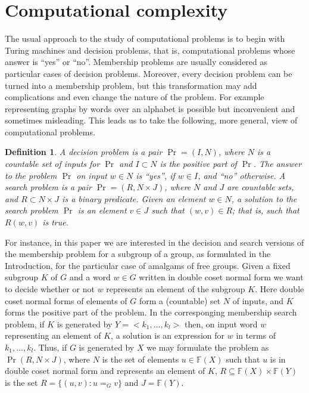 \documentclass[a4paper,12pt]{article}
\newtheorem{definition}[theorem]{Definition}
\numberwithin{equation}{section}
\numberwithin{figure}{section}
\newcommand{\FF}{\ensuremath{\mathbb{F}}}
\begin{document}
\section{Computational complexity}\label{sec:TC}
The usual approach to the study of computational problems is to
begin with Turing machines and decision
problems, that is, computational problems whose answer is ``yes'' or
``no''. Membership problems are usually considered as particular
cases of decision problems.
Moreover, every decision problem can be turned into a membership
problem, but this transformation may add complications and even
change the nature of the problem. For example representing graphs by
words over an alphabet is possible but inconvenient and sometimes
misleading. This leads us to take the following, more general, view of computational
problems.
\begin{definition}
A \emph{decision problem} is a pair $\Pr = (I,N)$, where $N$ is a countable
set of \emph{inputs} for $\Pr$ and $I\subset N$ is the \emph{positive part} of
$\Pr$. The \emph{answer} to the problem $\Pr$ on  input $w\in N$ is ``yes'',
if $w\in I$,
and ``no'' otherwise. A \emph{search problem} is a pair
$\Pr = (R,N\times J)$, where $N$ and $J$
are countable sets, and $R\subset N\times J$ is a binary predicate.
Given an element $w\in N$, a \emph{solution} to the search problem
$\Pr$ is an element $v\in J$ such
that $(w,v)\in R$; that is, such that $R(w,v)$ is true.
\end{definition}

For instance, in this paper we are interested in the decision and search
versions of the membership problem for a subgroup of a group, as formulated
in the Introduction, for the particular case of amalgams of free groups.
Given
 a fixed subgroup $K$ of $G$ and a word $w \in G$ written in
double coset normal form we want to decide
whether or not $w$ represents an element of  the subgroup $K$.
Here double coset normal forms of elements of $G$ form a (countable)
set $N$ of inputs, and $K$ forms the positive part of the problem.
In  the corresponging membership search problem, if $K$ is
generated by $Y=<k_1, \ldots, k_l>$ then, on input word $w$ representing an element
of $K$, a solution is an expression for $w$ in terms of $k_1, \ldots, k_l$.
Thus, if $G$ is generated by $X$ we may formulate the problem as
$\Pr(R,N\times J)$, where $N$ is the set of elements $u\in \FF(X)$ such
that $u$ is in double coset normal form and represents an element of $K$,
$R\subseteq \FF(X)\times \FF(Y)$ is the set $R=\{(u,v): u=_G v\}$ and
$J=\FF(Y)$.
\end{document}
